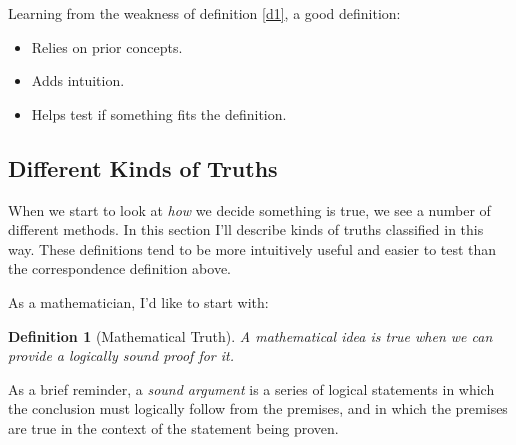 \documentclass[11pt, oneside]{article}   	%
\newtheorem{defn}{Definition}
\begin{document}
Learning from the weakness of definition \ref{d1}, a good definition:
\begin{itemize}
    \item Relies on prior concepts.
    \item Adds intuition.
    \item Helps test if something fits the definition.
\end{itemize}


\subsection{Different Kinds of Truths}

When we start to look at {\em how} we decide something is true, we see a number
of different methods. In this section I'll describe kinds of truths classified
in this way. These definitions tend to be more intuitively useful and easier to
test than the correspondence definition above.

As a mathematician, I'd like to start with:

\begin{defn}[Mathematical Truth]
    A mathematical idea is true when we can provide a logically sound proof for
    it.
\end{defn}

As a brief reminder, a {\em sound argument} is a series of logical statements in
which the conclusion must logically follow from the premises, and in which the
premises are true in the context of the statement being proven.
\end{document}
